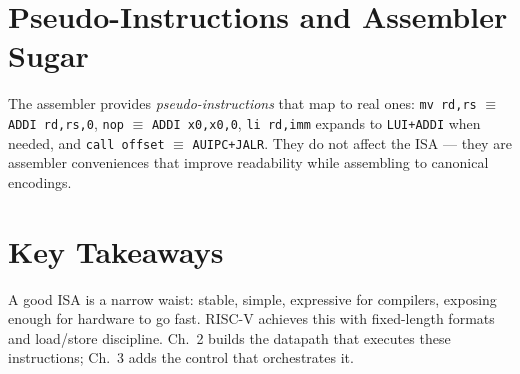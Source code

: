\section{Pseudo-Instructions and Assembler Sugar}
The assembler provides \emph{pseudo-instructions} that map to real ones: \texttt{mv rd,rs} $\equiv$ \texttt{ADDI rd,rs,0}, \texttt{nop} $\equiv$ \texttt{ADDI x0,x0,0}, \texttt{li rd,imm} expands to \texttt{LUI+ADDI} when needed, and \texttt{call offset} $\equiv$ \texttt{AUIPC+JALR}. They do not affect the ISA --- they are assembler conveniences that improve readability while assembling to canonical encodings.

\section{Key Takeaways}
A good ISA is a narrow waist: stable, simple, expressive for compilers, exposing enough for hardware to go fast.
RISC-V achieves this with fixed-length formats and load/store discipline. Ch.~2 builds the datapath that executes
these instructions; Ch.~3 adds the control that orchestrates it.

